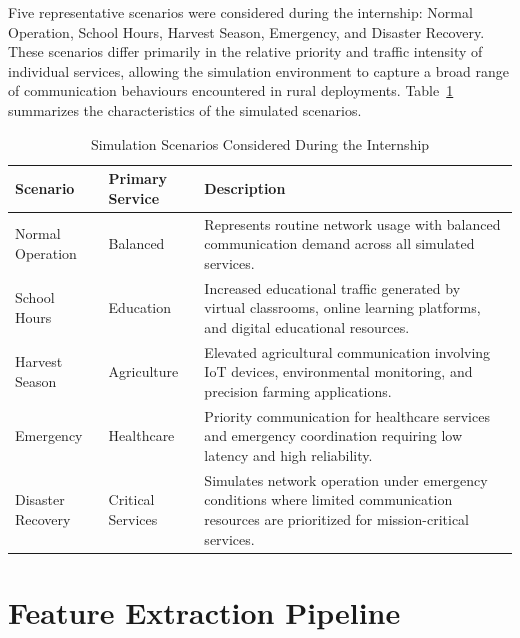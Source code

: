\documentclass[12pt,a4paper]{report}
\begin{document}
	Five representative scenarios were considered during the internship: Normal Operation, School Hours, Harvest Season, Emergency, and Disaster Recovery. These scenarios differ primarily in the relative priority and traffic intensity of individual services, allowing the simulation environment to capture a broad range of communication behaviours encountered in rural deployments. Table~\ref{tab:scenarios} summarizes the characteristics of the simulated scenarios.
	
	\begin{table}[H]
		\centering
		\caption{Simulation Scenarios Considered During the Internship}
		\label{tab:scenarios}
		
		\begin{tabular}{|p{3.5cm}|p{3cm}|p{8cm}|}
			\hline
			
			\textbf{Scenario} &
			\textbf{Primary Service} &
			\textbf{Description}
			\\
			\hline
			
			Normal Operation &
			Balanced &
			Represents routine network usage with balanced communication demand across all simulated services.
			\\
			\hline
			
			School Hours &
			Education &
			Increased educational traffic generated by virtual classrooms, online learning platforms, and digital educational resources.
			\\
			\hline
			
			Harvest Season &
			Agriculture &
			Elevated agricultural communication involving IoT devices, environmental monitoring, and precision farming applications.
			\\
			\hline
			
			Emergency &
			Healthcare &
			Priority communication for healthcare services and emergency coordination requiring low latency and high reliability.
			\\
			\hline
			
			Disaster Recovery &
			Critical Services &
			Simulates network operation under emergency conditions where limited communication resources are prioritized for mission-critical services.
			\\
			\hline
			
		\end{tabular}
		
	\end{table}
	
	\section{Feature Extraction Pipeline}
	\label{sec:feature_extraction}
	
\end{document}

